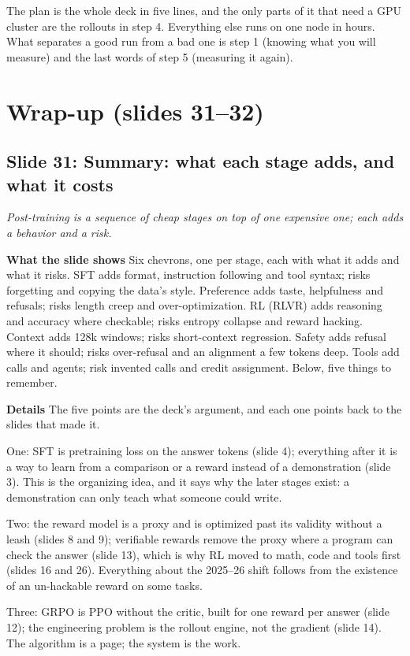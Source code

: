 \documentclass[11pt,letterpaper]{article}
\newcommand{\setstage}[1]{\colorlet{stagec}{#1}}
\newcommand{\slide}[3]{%
  \subsection[Slide #1: #2]{Slide #1: #2}%
  {\color{muted}\itshape #3\par}\medskip}
\newcommand{\para}[1]{\medskip\noindent\textbf{#1}\quad}
\newenvironment{intuition}{\begin{tcolorbox}[intuitionbox]}{\end{tcolorbox}}
\begin{document}
\begin{intuition}
The plan is the whole deck in five lines, and the only parts of it that need a GPU cluster are the rollouts in step 4. Everything else runs on one node in hours. What separates a good run from a bad one is step 1 (knowing what you will measure) and the last words of step 5 (measuring it again).
\end{intuition}

\clearpage
\setstage{ink}
\section{Wrap-up (slides 31--32)}

\slide{31}{Summary: what each stage adds, and what it costs}{Post-training is a sequence of cheap stages on top of one expensive one; each adds a behavior and a risk.}

\para{What the slide shows} Six chevrons, one per stage, each with what it adds and what it risks. SFT adds format, instruction following and tool syntax; risks forgetting and copying the data's style. Preference adds taste, helpfulness and refusals; risks length creep and over-optimization. RL (RLVR) adds reasoning and accuracy where checkable; risks entropy collapse and reward hacking. Context adds 128k windows; risks short-context regression. Safety adds refusal where it should; risks over-refusal and an alignment a few tokens deep. Tools add calls and agents; risk invented calls and credit assignment. Below, five things to remember.

\para{Details} The five points are the deck's argument, and each one points back to the slides that made it.

One: SFT is pretraining loss on the answer tokens (slide 4); everything after it is a way to learn from a comparison or a reward instead of a demonstration (slide 3). This is the organizing idea, and it says why the later stages exist: a demonstration can only teach what someone could write.

Two: the reward model is a proxy and is optimized past its validity without a leash (slides 8 and 9); verifiable rewards remove the proxy where a program can check the answer (slide 13), which is why RL moved to math, code and tools first (slides 16 and 26). Everything about the 2025--26 shift follows from the existence of an un-hackable reward on some tasks.

Three: GRPO is PPO without the critic, built for one reward per answer (slide 12); the engineering problem is the rollout engine, not the gradient (slide 14). The algorithm is a page; the system is the work.
\end{document}
